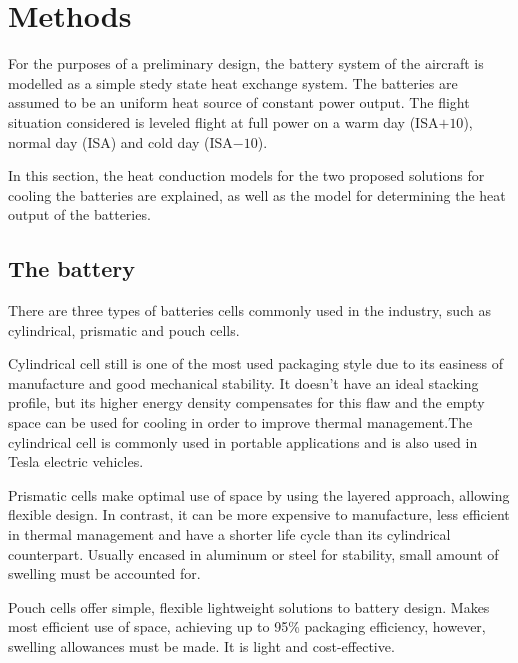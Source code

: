 \section{Methods}
\label{sec:methods}


For the purposes of a preliminary design,
 the battery system of the aircraft is modelled as a simple stedy state heat exchange system.
The batteries are assumed to be an uniform heat source of constant power output.
The flight situation considered is leveled flight at full power on a warm day (ISA$+10$), normal day (ISA) and cold day (ISA$-10$).

In this section, the heat conduction models for the two proposed solutions for cooling the batteries are explained, as well as the model for determining the heat output of the batteries.

\subsection{The battery}
\label{sec:battery}
There are three types of batteries cells commonly used in the industry, such as cylindrical, prismatic and pouch cells. 

Cylindrical cell still is one of the most used packaging style due to its easiness of manufacture and good mechanical stability. It doesn't have an ideal stacking profile, but its higher energy density compensates for this flaw and the empty space can be used for cooling in order to improve thermal management.The cylindrical cell is commonly used in portable applications and is also used in Tesla electric vehicles.

Prismatic cells make optimal use of space by using the layered approach, allowing flexible design. In contrast, it can be more expensive to manufacture, less efficient in thermal management and have a shorter life cycle than its cylindrical counterpart. Usually encased in aluminum or steel for stability, small amount of swelling must be accounted for.

Pouch cells offer simple, flexible lightweight solutions to battery design. Makes most efficient use of space, achieving up to 95\% packaging efficiency, however, swelling allowances must be made. It is light and cost-effective.\cite{packaging}

